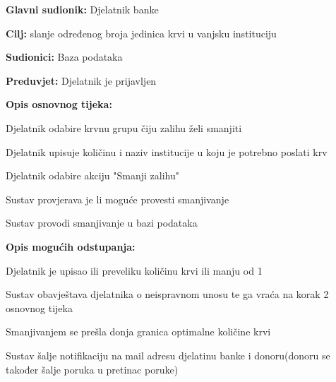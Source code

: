 \noindent {}
					\begin{packed_item}
	
						\item \textbf{Glavni sudionik: }Djelatnik banke
						\item \textbf{Cilj:} slanje određenog broja jedinica krvi u vanjsku instituciju
						\item \textbf{Sudionici:} Baza podataka
						\item \textbf{Preduvjet:} Djelatnik je prijavljen
						\item \textbf{Opis osnovnog tijeka:}
						
						\item[] \begin{packed_enum}
	
							\item Djelatnik odabire krvnu grupu čiju zalihu želi smanjiti
							\item Djelatnik upisuje količinu i naziv institucije u koju je potrebno poslati krv
							\item Djelatnik odabire akciju "Smanji zalihu"
							\item Sustav provjerava je li moguće provesti smanjivanje
							\item Sustav provodi smanjivanje u bazi podataka
						\end{packed_enum}
						\item  \textbf{Opis mogućih odstupanja:}
						
						\item[] \begin{packed_item}
							\item[4.a] Djelatnik je upisao ili preveliku količinu krvi ili manju od 1				
							\item[] \begin{packed_enum}
								
								\item  Sustav obavještava djelatnika o neispravnom unosu te ga vraća na korak 2 osnovnog tijeka
									\end{packed_enum}
							\item[5.a] Smanjivanjem se prešla donja granica optimalne količine krvi
							\item[] \begin{packed_enum}
								
								\item  Sustav šalje notifikaciju na mail adresu djelatinu banke i donoru(donoru se također šalje poruka u pretinac poruke)
							 

								
									\end{packed_enum}
								\end{packed_item}			
									
									
									
					\end{packed_item}
				

